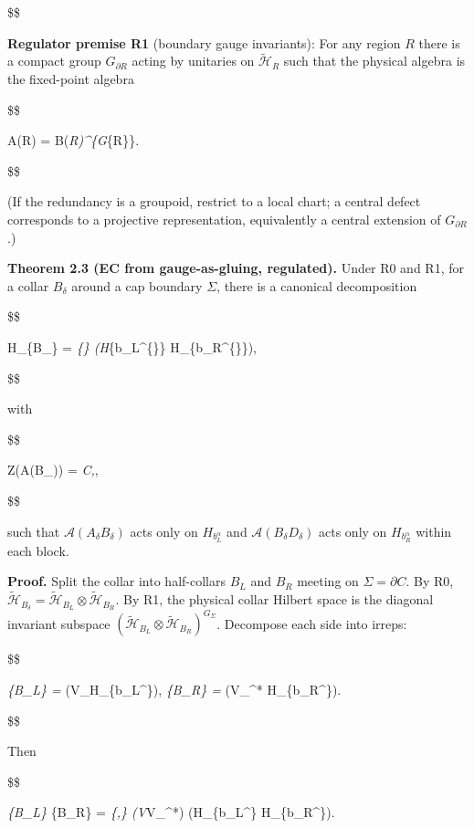 \documentclass[11pt,a4paper]{article}
\theoremstyle{remark}
\begin{document}
\$\$

\textbf{Regulator premise R1} (boundary gauge invariants): For any region \(R\) there is a
compact group \(G_{\partial R}\) acting by unitaries on \(\tilde{\mathcal H}_R\) such
that the physical algebra is the fixed-point algebra

\$\$

A(R) = \mathcal B(\emph{R)\^{}\{G}\{\partial R\}\}.

\$\$

(If the redundancy is a groupoid, restrict to a local chart; a central defect
corresponds to a projective representation, equivalently a central extension
of \(G_{\partial R}\).)

\textbf{Theorem 2.3 (EC from gauge-as-gluing, regulated).} Under R0 and R1, for a
collar \(B_\delta\) around a cap boundary \(\Sigma\), there is a canonical
decomposition

\$\$

H\_\{B\_\delta\} = \bigoplus\emph{\{\alpha\}
(H}\{b\_L\^{}\{\alpha\}\} \otimes H\_\{b\_R\^{}\{\alpha\}\}),

\$\$

with

\$\$

Z(A(B\_\delta)) = \bigoplus\emph{\alpha \mathbb C,}\alpha,

\$\$

such that \(\mathcal{A}(A_\delta B_\delta)\) acts only on \(H_{b_L^\alpha}\) and
\(\mathcal{A}(B_\delta D_\delta)\) acts only on \(H_{b_R^\alpha}\) within each block.

\textbf{Proof.} Split the collar into half-collars \(B_L\) and \(B_R\) meeting on
\(\Sigma = \partial C\). By R0, \(\tilde{\mathcal H}_{B_\delta} =
\tilde{\mathcal H}_{B_L} \otimes \tilde{\mathcal H}_{B_R}\). By R1,
the physical collar Hilbert space is the diagonal invariant subspace
\((\tilde{\mathcal H}_{B_L} \otimes \tilde{\mathcal H}_{B_R})^{G_\Sigma}\).
Decompose each side into irreps:

\$\$

\emph{\{B\_L\} = \bigoplus}\alpha (V\_\alpha \otimes H\_\{b\_L\^{}\alpha\}),\qquad
{}\emph{\{B\_R\} = \bigoplus}\beta (V\_\beta\^{}* \otimes H\_\{b\_R\^{}\beta\}).

\$\$

Then

\$\$

\emph{\{B\_L\} \otimes {}}\{B\_R\}
= \bigoplus\emph{\{\alpha,\beta\}
(V}\alpha \otimes V\_\beta\^{}*) \otimes
(H\_\{b\_L\^{}\alpha\} \otimes H\_\{b\_R\^{}\beta\}).
\end{document}
